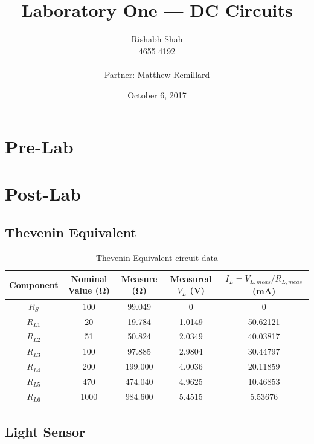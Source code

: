 \documentclass[10pt]{article}
\begin{document}
\title{Laboratory One --- DC Circuits}
\date{October 6, 2017}
\author{Rishabh Shah\\ 4655 4192\\ \\ Partner: Matthew Remillard}
\maketitle
\newpage

\section*{Pre-Lab}

\section*{Post-Lab}
\subsection*{Thevenin Equivalent}
\begin{table}[H]
	\centering
	\begin{tabular}{|c|c|c|c|c|}
		\hline
		\textbf{Component} & \textbf{Nominal Value (\si{\ohm})} & \textbf{Measure (\si{\ohm})} & \textbf{Measured \(V_L\) (V)} & \textbf{\(I_L = V_{L,meas}/R_{L,meas}\) (mA)} \\
		\hline
		\(R_S\) & 100 & 99.049 & 0 & 0 \\
		\hline
		\(R_{L1}\) & 20 & 19.784 & 1.0149 & 50.62121 \\
		\hline
		\(R_{L2}\) & 51 & 50.824 & 2.0349 & 40.03817 \\
		\hline
		\(R_{L3}\) & 100 & 97.885 & 2.9804 & 30.44797 \\
		\hline
		\(R_{L4}\) & 200 & 199.000 & 4.0036 & 20.11859 \\
		\hline
		\(R_{L5}\) & 470 & 474.040 & 4.9625 & 10.46853 \\
		\hline
		\(R_{L6}\) & 1000 & 984.600 & 5.4515 & 5.53676 \\
		\hline
	\end{tabular}
	\caption{Thevenin Equivalent circuit data}
\end{table}

\subsection*{Light Sensor}
\end{document}
